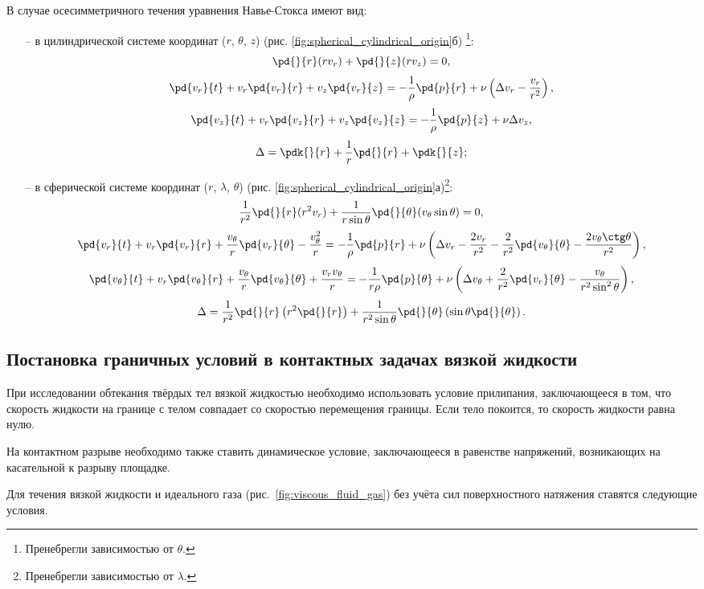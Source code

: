\documentclass[a4paper, 14pt]{extarticle}
\begin{document}
В случае \alert{осесимметричного течения} уравнения Навье-Стокса имеют вид:
\begin{itemize}
	\item[--] в цилиндрической системе координат ($r$, $\theta$, $z$) (рис. \ref{fig:spherical_cylindrical_origin}б) \footnote{Пренебрегли зависимостью от $\theta$.}:
\[
\pd{}{r} (r v_r) + \pd{}{z} (r v_z) = 0,
\]
\[
\pd{v_r}{t} + v_r\pd{v_r}{r} + v_z\pd{v_r}{z} = -\frac{1}{\rho} \pd{p}{r} + \nu \left(\Delta v_r - \frac{v_r}{r^2}\right),
\]
\[
\pd{v_z}{t} + v_r\pd{v_z}{r} + v_z\pd{v_z}{z} = -\frac{1}{\rho} \pd{p}{z} + \nu \Delta v_z,
\]
\[
\Delta = \pdk{}{r}+\frac{1}{r}\pd{}{r} + \pdk{}{z};
\]
	\item[--] в сферической системе координат ($r$,  $\lambda$, $\theta$) (рис. \ref{fig:spherical_cylindrical_origin}а)\footnote{Пренебрегли зависимостью от $\lambda$.}:
\[
\frac{1}{r^2} \pd{}{r}(r^2 v_r) + \frac{1}{r \sin \theta} \pd{}{\theta}(v_\theta \sin\theta) = 0,
\]
\[
\pd{v_r}{t} + v_r\pd{v_r}{r} + \frac{v_\theta}{r} \pd{v_r}{\theta} - \frac{v_\theta^2}{r} = -\frac{1}{\rho} \pd{p}{r} + 
\nu \left(\Delta v_r - \frac{2 v_r}{r^2} - \frac{2}{r^2}\pd{v_\theta}{\theta} - \frac{2 v_\theta \ctg\theta}{r^2}\right),
\]
\[
\pd{v_\theta}{t} + v_r\pd{v_\theta}{r} + \frac{v_\theta}{r} \pd{v_\theta}{\theta} + \frac{v_r v_\theta}{r} = 
-\frac{1}{r \rho} \pd{p}{\theta} + 
\nu \left(\Delta v_\theta + \frac{2}{r^2}\pd{v_r}{\theta} - \frac{v_\theta}{r^2 \sin^2 \theta}\right),
\]
\[
\Delta = \frac{1}{r^2} \pd{}{r}\left(r^2\pd{}{r}\right) + \frac{1}{r^2 \sin\theta} \pd{}{\theta} \left(\sin\theta \pd{}{\theta}\right).
\]
\end{itemize}

\subsection{Постановка граничных условий в контактных задачах вязкой жидкости}

При исследовании обтекания твёрдых тел вязкой жидкостью необходимо использовать условие \alert{прилипания}, заключающееся в том, что скорость жидкости на границе с телом совпадает со скоростью перемещения границы. Если тело покоится, то скорость жидкости равна нулю.

На \alert{контактном разрыве} необходимо также ставить динамическое условие, заключающееся в равенстве напряжений, возникающих на касательной к разрыву площадке.

Для течения вязкой жидкости и идеального газа (рис.~\ref{fig:viscous_fluid_gas}) без учёта сил поверхностного натяжения ставятся следующие условия.
\end{document}
